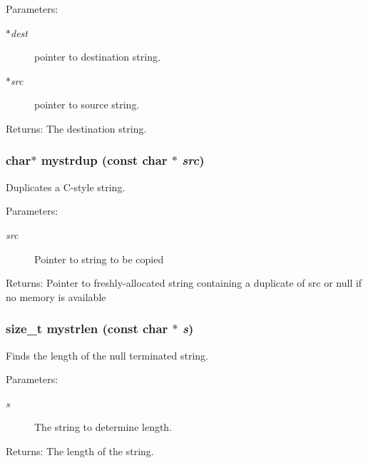 \begin{Desc}
\item[Parameters:]
\begin{description}
\item[{\em $\ast$dest}]pointer to destination string. \item[{\em $\ast$src}]pointer to source string. \end{description}
\end{Desc}
\begin{Desc}
\item[Returns:]The destination string. \end{Desc}
\subsubsection{\setlength{\rightskip}{0pt plus 5cm}char$\ast$ mystrdup (const char $\ast$ {\em src})}\label{mystring_8c_148a52c665d88f52fb4995338a319d3c}


Duplicates a C-style string. \begin{Desc}
\item[Parameters:]
\begin{description}
\item[{\em src}]Pointer to string to be copied \end{description}
\end{Desc}
\begin{Desc}
\item[Returns:]Pointer to freshly-allocated string containing a duplicate of src or null if no memory is available \end{Desc}
\subsubsection{\setlength{\rightskip}{0pt plus 5cm}size\_\-t mystrlen (const char $\ast$ {\em s})}\label{mystring_8c_a231246d7f6f97231aa18689cc2ea20a}


Finds the length of the null terminated string. 

\begin{Desc}
\item[Parameters:]
\begin{description}
\item[{\em s}]The string to determine length. \end{description}
\end{Desc}
\begin{Desc}
\item[Returns:]The length of the string. \end{Desc}
